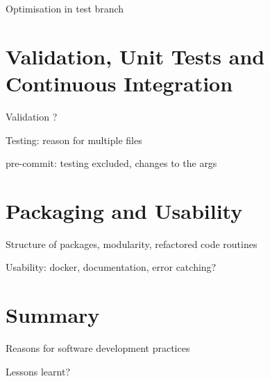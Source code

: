 \documentclass[12pt]{article}
\begin{document}
Optimisation in test branch

\section*{Validation, Unit Tests and Continuous Integration}

Validation ?

Testing: reason for multiple files

pre-commit: testing excluded, changes to the args

\section*{Packaging and Usability}

Structure of packages, modularity, refactored code routines

Usability: docker, documentation, error catching?

\section*{Summary}

Reasons for software development practices

Lessons learnt?


\end{document}
